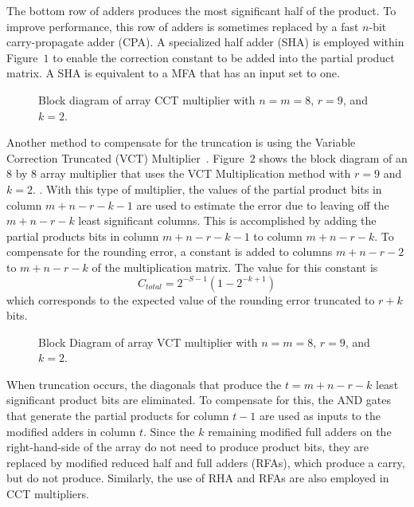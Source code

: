 The bottom 
row of adders produces the most significant half of the product. 
To improve performance, this row of adders is sometimes replaced by a 
fast $n$-bit carry-propagate adder (CPA). 
A specialized half adder (SHA) is employed within Figure~$1$ to enable the
correction constant to be added into the partial product matrix.
A SHA is equivalent to a MFA that has an input set to one.  
\begin{figure}
\begin{center}
\setlength{\unitlength}{0.0105in}%
\end{center}
\caption{Block diagram of array CCT multiplier with $n=m=8$, $r=9$, and
$k=2$.}
\end{figure}

Another method to compensate for the truncation is using
the Variable Correction Truncated (VCT) Multiplier~\cite{king}. 
Figure~$2$ shows the block diagram of 
an $8$ by $8$ array multiplier
that uses the VCT Multiplication 
method with $r=9$ and $k=2$. . 
With this type of multiplier, the values of the partial 
product bits in column $m+n-r-k-1$ are used to estimate the error due to
leaving off the $m+n-r-k$ least significant columns. This is 
accomplished by adding the partial products bits in column $m+n-r-k-1$ to
column $m+n-r-k$. To compensate for the rounding error, a constant 
is added to columns $m+n-r-2$ to $m+n-r-k$ of the multiplication matrix. 
The value for this constant is 
\begin{equation}
C_{total} = 2^{-S-1}(1 - 2^{-k+1})
\end{equation}
which corresponds to the expected value of the rounding error
truncated to $r+k$ bits. 
\begin{figure}
\begin{center}
\setlength{\unitlength}{0.0105in}%
\end{center}
\caption{Block Diagram of array VCT multiplier with $n=m=8$, $r=9$, and
$k=2$.}
\end{figure}

When truncation occurs, the
diagonals that produce the $t=m+n-r-k$ least significant product bits are
eliminated. 
To compensate for this, the AND gates that generate the partial products 
for column $t-1$ are used as inputs to the modified adders in column $t$. 
Since the $k$ remaining modified full adders on the right-hand-side of
the array do not need to produce product bits, they 
are replaced by modified reduced half and 
full adders (RFAs), which produce a carry, 
but do not produce.  Similarly, the use of RHA and RFAs are also employed
in CCT multipliers.

